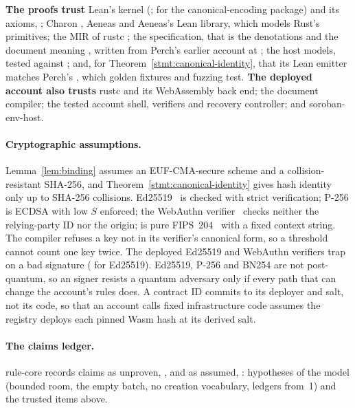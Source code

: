 \begin{perchbox}
\textbf{The proofs trust} Lean's kernel (;
 for the canonical-encoding package) and its axioms,
; Charon , Aeneas  and
Aeneas's Lean library, which models Rust's primitives; the MIR of rustc
; the specification, that is the denotations and the
document meaning , written from Perch's earlier account at
; the host models, tested against
; and, for
Theorem~\ref{stmt:canonical-identity}, that its Lean emitter matches Perch's
, which golden fixtures and fuzzing test. \textbf{The deployed
account also trusts} rustc  and its WebAssembly back end; the
document compiler; the tested account shell, verifiers and recovery controller;
and soroban-env-host.
\end{perchbox}

\paragraph{Cryptographic assumptions.} Lemma~\ref{lem:binding} assumes an
EUF-CMA-secure scheme and a collision-resistant SHA-256, and
Theorem~\ref{stmt:canonical-identity} gives hash identity only up to SHA-256
collisions. Ed25519~\cite{rfc8032} is checked with strict verification; P-256 is
ECDSA with low $S$ enforced; the WebAuthn verifier~\cite{webauthn2} checks
neither the relying-party ID nor the origin;  is pure
FIPS~204~\cite{fips204} with a fixed context string. The compiler refuses a key
not in its verifier's canonical form, so a threshold cannot count one key twice.
The deployed Ed25519 and WebAuthn verifiers trap on a bad signature
( for Ed25519). Ed25519, P-256 and BN254 are not
post-quantum, so an  signer resists a quantum adversary only
if every path that can change the account's rules does. A contract ID commits to
its deployer and salt, not its code, so that an account calls fixed
infrastructure code assumes the registry deploys each pinned Wasm hash at its
derived salt.

\paragraph{The claims ledger.} rule-core records  claims
as unproven, , and  as assumed,
: hypotheses of the model (bounded room, the empty
batch, no creation vocabulary, ledgers from~1) and the trusted items above.
